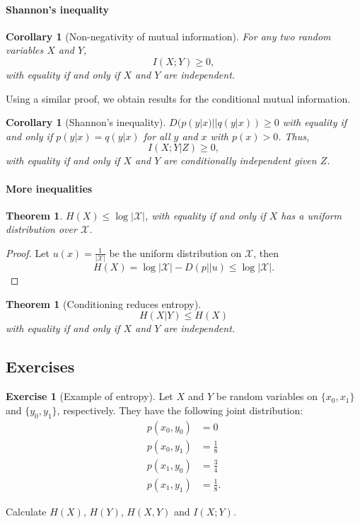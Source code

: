 \documentclass[a4paper, 11pt, openany]{book}
\numberwithin{equation}{section}
\theoremstyle{plain}
\newtheorem{theorem}	[equation]	{Theorem}
\newtheorem{corollary}	[equation]	{Corollary}
\theoremstyle{definition}
\newtheorem{exercise}   {Exercise}  [section]
\newcommand{\alphabet}[1]{\mathcal{#1}}
\begin{document}
\paragraph{Shannon's inequality}
\begin{corollary}[Non-negativity of mutual information]
For any two random variables $X$ and $Y$,
\[
	I(X;Y) \ge 0,
\]
with equality if and only if $X$ and $Y$ are independent.
\end{corollary}

Using a similar proof, we obtain results for the conditional mutual information.

\begin{corollary}[Shannon's inequality]
$D(p(y|x) || q(y|x)) \ge 0$ with equality if and only if $p(y|x) = q(y|x)$ for all $y$ and $x$ with $p(x) > 0$. Thus,
\[
	I(X;Y|Z) \ge 0,
\]
with equality if and only if $X$ and $Y$ are conditionally independent given $Z$.
\end{corollary}



\paragraph{More inequalities}
\begin{theorem}
$H(X) \le \log |\alphabet{X}|$, with equality if and only if $X$ has a uniform distribution over $\alphabet{X}$.
\end{theorem}

\begin{proof}
Let $u(x) = \frac{1}{|\alphabet{X}|}$ be the uniform distribution on $\alphabet{X}$, then
$$
	H(X) = \log |\alphabet{X}| - D(p||u) \le \log |\alphabet{X}|.
$$
\end{proof}

\begin{theorem}[Conditioning reduces entropy]
$$
	H(X|Y) \le H(X)
$$
with equality if and only if $X$ and $Y$ are independent.
\end{theorem}





\subsection{Exercises}


\begin{exercise}[Example of entropy]
Let $X$ and $Y$ be random variables on $\{x_0,x_1\}$ and $\{y_0,y_1\}$, respectively. They have the following joint distribution:
\begin{align*}
	p(x_0,y_0) &= 0\\
	p(x_0,y_1) &= \frac{1}{8}\\
	p(x_1,y_0) &= \frac{3}{4}\\
	p(x_1,y_1) &= \frac{1}{8}.
\end{align*}

Calculate $H(X)$, $H(Y)$, $H(X,Y)$ and $I(X;Y)$.
\end{exercise}
\end{document}
